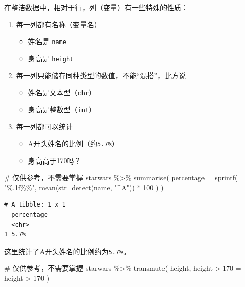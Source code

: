 \documentclass[
  letterpaper,
]{ctexbook}
\newenvironment{Shaded}{\begin{snugshade}}{\end{snugshade}}
\newcommand{\AttributeTok}[1]{\textcolor[rgb]{0.40,0.45,0.13}{#1}}
\newcommand{\CommentTok}[1]{\textcolor[rgb]{0.37,0.37,0.37}{#1}}
\newcommand{\DecValTok}[1]{\textcolor[rgb]{0.68,0.00,0.00}{#1}}
\newcommand{\FunctionTok}[1]{\textcolor[rgb]{0.28,0.35,0.67}{#1}}
\newcommand{\NormalTok}[1]{\textcolor[rgb]{0.00,0.23,0.31}{#1}}
\newcommand{\OtherTok}[1]{\textcolor[rgb]{0.00,0.23,0.31}{#1}}
\newcommand{\SpecialCharTok}[1]{\textcolor[rgb]{0.37,0.37,0.37}{#1}}
\newcommand{\StringTok}[1]{\textcolor[rgb]{0.13,0.47,0.30}{#1}}
\providecommand{\tightlist}{%
  \setlength{\itemsep}{0pt}\setlength{\parskip}{0pt}}\usepackage{longtable,booktabs,array}
\begin{document}
在整洁数据中，相对于行，列（变量）有一些特殊的性质：

\begin{enumerate}
\def\labelenumi{\arabic{enumi}.}
\tightlist
\item
  每一列都有名称（变量名）

  \begin{itemize}
  \tightlist
  \item
    姓名是 \texttt{name}
  \item
    身高是 \texttt{height}
  \end{itemize}
\item
  每一列只能储存同种类型的数值，不能``混搭''，比方说

  \begin{itemize}
  \tightlist
  \item
    姓名是文本型（\texttt{chr}）
  \item
    身高是整数型（\texttt{int}）
  \end{itemize}
\item
  每一列都可以统计

  \begin{itemize}
  \tightlist
  \item
    A开头姓名的比例（约\texttt{5.7\%}）
  \item
    身高高于170吗？
  \end{itemize}
\end{enumerate}

\begin{Shaded}
\begin{Highlighting}[]
\CommentTok{\# 仅供参考，不需要掌握}
\NormalTok{starwars }\SpecialCharTok{\%\textgreater{}\%}
  \FunctionTok{summarise}\NormalTok{(}
    \AttributeTok{percentage =} \FunctionTok{sprintf}\NormalTok{(}
      \StringTok{"\%.1f\%\%"}\NormalTok{,}
      \FunctionTok{mean}\NormalTok{(}\FunctionTok{str\_detect}\NormalTok{(name, }\StringTok{"\^{}A"}\NormalTok{)) }\SpecialCharTok{*} \DecValTok{100}
\NormalTok{    )}
\NormalTok{  )}
\end{Highlighting}
\end{Shaded}

\begin{verbatim}
# A tibble: 1 x 1
  percentage
  <chr>     
1 5.7%      
\end{verbatim}

这里统计了A开头姓名的比例约为\texttt{5.7\%}。

\begin{Shaded}
\begin{Highlighting}[]
\CommentTok{\# 仅供参考，不需要掌握}
\NormalTok{starwars }\SpecialCharTok{\%\textgreater{}\%}
  \FunctionTok{transmute}\NormalTok{(}
\NormalTok{    height,}
    \StringTok{\textasciigrave{}}\AttributeTok{height \textgreater{} 170}\StringTok{\textasciigrave{}} \OtherTok{=}\NormalTok{ height }\SpecialCharTok{\textgreater{}} \DecValTok{170}
\NormalTok{  )}
\end{Highlighting}
\end{Shaded}
\end{document}
